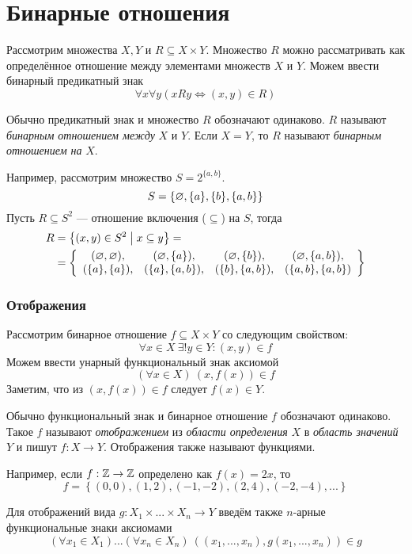 \part{Бинарные отношения}

Рассмотрим множества $X,Y$ и $R\subseteq X\times Y$. Множество $R$ можно рассматривать
как определённое отношение между элементами множеств $X$ и $Y$. Можем ввести бинарный
предикатный знак
\[
	\forall x\forall y(xRy\iff (x,y)\in R)
\]

Обычно предикатный знак и множество $R$ обозначают одинаково.
$R$ называют {\it бинарным отношением между} $X$ и $Y$. Если $X=Y$,
то $R$ называют {\it бинарным отношением на} $X$.

Например, рассмотрим множество $S=2^{\{a,b\}}$.
\[
	S=\{\varnothing,\{a\},\{b\},\{a,b\}\}
\]
Пусть $R\subseteq S^{2}$ --- отношение включения ($\subseteq$) на $S$, тогда
\[
	\begin{aligned}
		R
		&=\left\{(x,y)\in S^{2}\;\big|\; x\subseteq y\right\}=\\
		&=\left\{
			\begin{array}{cccc}
				(\varnothing,\varnothing),&(\varnothing,\{a\}),&(\varnothing,\{b\}),&(\varnothing,\{a,b\}),\\
				(\{a\},\{a\}),&(\{a\},\{a,b\}),&(\{b\},\{a,b\}),&(\{a,b\},\{a,b\})
			\end{array}\right\}
	\end{aligned}
\]

\section{Отображения}

Рассмотрим бинарное отношение $f\subseteq X\times Y$ со следующим свойством:
\[
	\forall x\in X~\exists! y\in Y:(x,y)\in f
\]
Можем ввести унарный функциональный знак аксиомой
\[
	(\forall x\in X)~(x,f(x))\in f
\]
Заметим, что из $(x,f(x))\in f$ следует $f(x)\in Y$.

Обычно функциональный знак и бинарное отношение $f$ обозначают одинаково.
Такое $f$ называют {\it отображением} из {\it области определения} $X$ в
{\it область значений} $Y$ и пишут $f:X\to Y$.
Отображения также называют функциями.

Например, если $f:\mathbb Z\to\mathbb Z$ определено как $f(x)=2x$, то
\[
	f=\left\{(0,0),(1,2),(-1,-2),(2,4),(-2,-4),...\right\}
\]

Для отображений вида $g:X_1\times ...\times X_{n}\to Y$
введём также $n$-арные функциональные знаки аксиомами
\[
	(\forall x_1\in X_1)...(\forall x_{n}\in X_{n})~
	((x_1,...,x_{n}), g(x_1,...,x_{n}))\in g
\]

